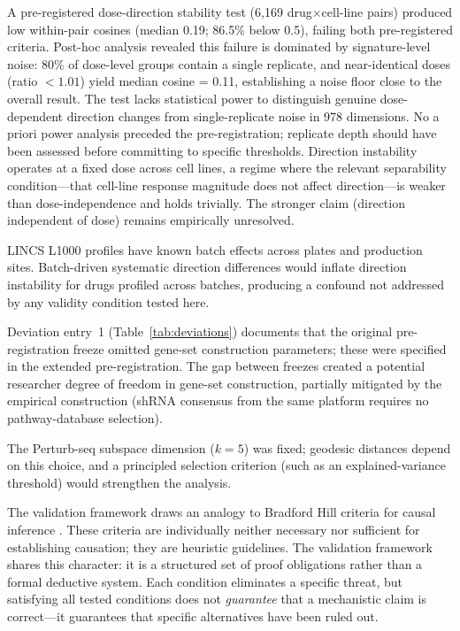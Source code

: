 \documentclass[11pt]{article}
\begin{document}
A pre-registered dose-direction stability test (6{,}169
drug$\times$cell-line pairs) produced low within-pair cosines (median
0.19; 86.5\% below 0.5), failing both pre-registered criteria. Post-hoc
analysis revealed this failure is dominated by signature-level noise:
80\% of dose-level groups contain a single replicate, and
near-identical doses (ratio $< 1.01$) yield median cosine = 0.11,
establishing a noise floor close to the overall result. The test lacks
statistical power to distinguish genuine dose-dependent direction
changes from single-replicate noise in 978 dimensions. No a priori
power analysis preceded the pre-registration; replicate depth should
have been assessed before committing to specific thresholds.
Direction instability operates at a fixed dose across cell lines, a
regime where the relevant separability condition---that cell-line
response magnitude does not affect direction---is weaker than
dose-independence and holds trivially. The stronger claim (direction
independent of dose) remains empirically unresolved.

LINCS L1000 profiles have known batch effects across plates and
production sites. Batch-driven systematic direction differences would
inflate direction instability for drugs profiled across batches,
producing a confound not addressed by any validity condition tested here.

Deviation entry~1 (Table~\ref{tab:deviations}) documents that the
original pre-registration freeze omitted gene-set construction parameters;
these were specified in the extended pre-registration. The gap between
freezes created a potential researcher degree of freedom in gene-set
construction, partially mitigated by the empirical construction (shRNA
consensus from the same platform requires no pathway-database selection).

The Perturb-seq subspace dimension ($k = 5$) was fixed; geodesic
distances depend on this choice, and a principled selection criterion
(such as an explained-variance threshold) would strengthen the analysis.

The validation framework draws an analogy to Bradford Hill criteria for causal
inference \citep{hill1965environment}. These criteria are individually
neither necessary nor
sufficient for establishing causation; they are heuristic guidelines. The
validation framework shares this character: it is a structured set of proof
obligations rather than a formal deductive system. Each condition eliminates
a specific threat, but satisfying all tested conditions does not
\emph{guarantee} that a mechanistic claim is correct---it guarantees
that specific alternatives have been ruled out.
\end{document}
